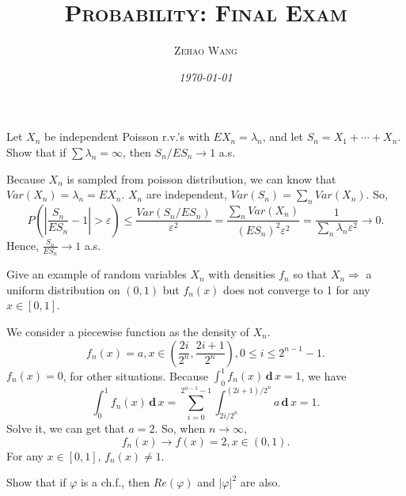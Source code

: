 \documentclass[11pt]{article}
\title{\textsc{Probability: Final Exam}}
\author{\textsc{Zehao Wang}}
\date{\emph{\today}}
\numberwithin{equation}{section}
\newcounter{exercise}[section]
\newenvironment{exercise}[1][\textsc{Exercise }\thesection.\refstepcounter{exercise}\theexercise]{\begin{tcolorbox}[colback=black!15, colframe=black!80, breakable, title=\textsc{Exercise }#1]}{\end{tcolorbox}}
\newcounter{example}[section]
\newenvironment{solution}{\begin{tcolorbox}[colback=white, colframe=black!50, breakable, title=Solution. ]\setlength{\parskip}{0.8em}}{\end{tcolorbox}}
\newcommand{\der}{\,\mathbf{d}\,}
\begin{document}
    \maketitle

    \begin{exercise}[2.3.19]
        Let $X_{n}$ be independent Poisson r.v.'s with $E X_{n}=\lambda_{n}$, and let $S_{n}=X_{1}+\cdots+X_{n}$. Show that if $\sum \lambda_{n}=\infty$, then $S_{n} / E S_{n} \rightarrow 1$ a.s. 
    \end{exercise}
    \begin{solution}
        Because $X_n$ is sampled from poisson distribution, we can know that $Var(X_n)=\lambda_n=EX_n$. $X_n$ are independent, $Var(S_n)=\sum_nVar(X_n)$. So, 
        \[
            P\left(\left|\frac{S_n}{ES_n}-1\right|>\varepsilon\right)\leqslant\frac{Var(S_n/ES_n)}{\varepsilon^2}=\frac{\sum_{n}Var(X_n)}{(ES_n)^2\varepsilon^2}=\frac{1}{\sum_n\lambda_n\varepsilon^2}\to 0. 
        \]
        Hence, $\frac{S_n}{ES_n}\to 1$ a.s. 
    \end{solution}

    \begin{exercise}[3.2.1]
        Give an example of random variables $X_{n}$ with densities $f_{n}$ so that $X_{n} \Rightarrow$ a uniform distribution on $(0,1)$ but $f_{n}(x)$ does not converge to 1 for any $x \in[0,1]$. 
    \end{exercise}

    \begin{solution}
        We consider a piecewise function as the density of $X_n$. 
        \[
            f_n(x)=a, x\in\left(\frac{2i}{2^n}, \frac{2i+1}{2^n}\right), 0\leqslant i\leqslant2^{n-1}-1. 
        \]
        $f_n(x)=0$, for other situations. Because $\int_0^1f_n(x)\der x=1$, we have
        \[
            \int_0^1f_n(x)\der x=\sum_{i=0}^{2^{n-1}-1}\int_{2i/2^n}^{(2i+1)/2^n}a\der x=1. 
        \]
        Solve it, we can get that $a=2$. So, when $n\to\infty$, 
        \[
            f_n(x)\to f(x)=2, x\in(0,1). 
        \]
        For any $x\in[0,1]$, $f_n(x)\neq1$. 
    \end{solution}

    \begin{exercise}[3.3.1]
        Show that if $\varphi$ is a ch.f., then $Re(\varphi)$ and $|\varphi|^2$ are also. 
    \end{exercise}
\end{document}
